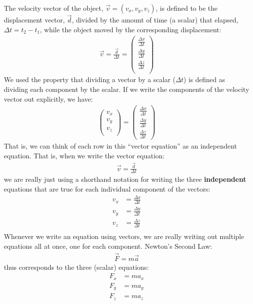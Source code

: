 The velocity vector of the object, $\vec v=(v_x, v_y, v_z)$, is defined to be the displacement vector, $\vec d$, divided by the amount of time (a scalar) that elapsed, $\Delta t=t_2 -t_1$, while the object moved by the corresponding displacement:
\begin{align*}
\vec v = \frac{\vec d}{\Delta t}=\begin{pmatrix}
           \frac{\Delta x}{\Delta t} \\
           \frac{\Delta y}{\Delta t} \\
           \frac{\Delta z}{\Delta t} \\
         \end{pmatrix}
\end{align*}
We used the property that dividing a vector by a scalar ($\Delta t$) is defined as dividing each component by the scalar. If we write the components of the velocity vector out explicitly, we have:
\begin{align*}
\begin{pmatrix}
           v_x \\
           v_y \\
           v_z \\
         \end{pmatrix} = \begin{pmatrix}
           \frac{\Delta x}{\Delta t} \\
           \frac{\Delta y}{\Delta t} \\
           \frac{\Delta z}{\Delta t}
         \end{pmatrix}
\end{align*}
That is, we can think of each row in this ``vector equation'' as an independent equation. That is, when we write the vector equation:
\begin{align*}
\vec v = \frac{\vec d}{\Delta t}
\end{align*}
we are really just using a shorthand notation for writing the three \textbf{independent} equations that are true for each individual component of the vectors:
\begin{align*}
v_x &= \frac{\Delta x}{\Delta t} \\
v_y &= \frac{\Delta y}{\Delta t} \\
v_z &= \frac{\Delta z}{\Delta t} \\
\end{align*}
Whenever we write an equation using vectors, we are really writing out multiple equations all at once, one for each component. Newton's Second Law:
\begin{align*}
\vec F = m \vec a
\end{align*}
thus corresponds to the three (scalar) equations:
\begin{align*}
F_x &= ma_x\\
F_y &= ma_y\\
F_z &= ma_z\\
\end{align*}

